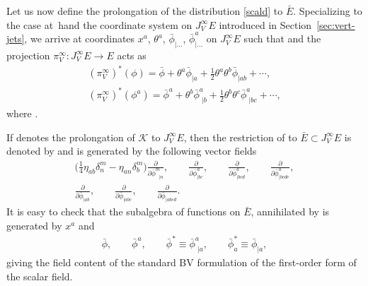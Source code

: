\documentclass[10pt,a4paper]{amsart}
\numberwithin{equation}{section}
\theoremstyle{definition}
\renewcommand{\tilde}{\widetilde}
\renewcommand{\d}{\partial}
\newcommand{\ffrac}[2]{\raisebox{.5pt}%
 {\footnotesize$\displaystyle\frac{#1}{#2}$}\kern1pt}
\newcommand{\dl}[1]{\mathchoice{\ffrac{\d}{\d #1}}{\frac{\d}{\d #1}}{\ffrac{\d}{\d #1}}{\ffrac{\d}{\d #1}}}
\def\cK{\mathcal{K}}
\newcommand{\vprol}{\tilde}
\begin{document}
Let us now define the prolongation of the distribution \eqref{scald} to $\bar{E}$.
Specializing to the case at~hand the coordinate system on $J^\infty_VE$ introduced in Section~\ref{sec:vert-jets}, we arrive at coordinates
$x^a$, $\theta^a$, $\bar \phi_{|\dots}$, $\bar \phi^a_{|\dots}$ on $J^\infty_VE$
such that \smash{$D^{(\theta)}_a=\dl{\theta^a}$} and the projection $\pi^\infty_V\colon J^\infty_VE \to E$ acts as
\begin{gather*}
 (\pi^\infty_V)^*(\phi)=\bar\phi+\theta^a\bar\phi_{|a}+\frac{1}{2}\theta^a\theta^b\bar\phi_{|ab}+\cdots,\\
 (\pi^\infty_V)^*(\phi^a)=\bar\phi^a+\theta^b\bar\phi^a_{\,\,|b}+\frac{1}{2}\theta^b\theta^c\bar\phi^a_{\,\,|bc}+\cdots,
 \end{gather*}
where .

If \smash{\smash{$\vprol{\cK}$}} denotes the prolongation of $\cK$ to $J^\infty_VE$, then the restriction of \smash{$\vprol{\cK}$} to
$\bar E\subset J^\infty_VE$ is denoted by \smash{$\vprol{\cK}_0$} and is generated by the following vector fields
\begin{gather*}
 \biggl(\frac{1}{4}\eta_{ab}\delta^m_n-\eta_{an}\delta^m_b\biggr)\frac{\partial}{\partial \bar{\phi}^m_{\,\,\,\,|n}},
 \qquad \frac{\partial}{\partial \bar\phi^a_{|bc}},
 \qquad \frac{\partial}{\partial \bar\phi^a_{|bcd}},
 \qquad \frac{\partial}{\partial \bar\phi^a_{|bcde}},\\
 \frac{\partial}{\partial\bar{\phi}_{|ab}},\qquad
 \frac{\partial}{\partial\bar{\phi}_{|abc}}, \qquad
 \frac{\partial}{\partial\bar{\phi}_{|abcd}}.
 \end{gather*}
It is easy to check that the subalgebra of functions on $\bar E$, annihilated by \smash{$\vprol{\cK}_0$} is generated by $x^a$ and
\begin{gather}
 \bar\phi,\qquad \bar\phi^a,\qquad
 \bar\phi^*\equiv\bar\phi^a_{\,\,|a},\qquad \bar\phi^*_a\equiv\bar\phi_{|a},\label{scaldalg}
 \end{gather}
giving the field content of the standard BV formulation of the first-order form of the scalar field.
\end{document}
